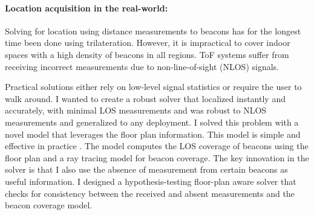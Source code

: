 \documentclass[10pt]{article}
\begin{document}
\paragraph{Location acquisition in the real-world: }
Solving for location using distance measurements to beacons has for the longest time been done using trilateration. However, it is impractical to cover indoor spaces with a high density of beacons in all regions. %
ToF systems suffer from receiving incorrect measurements due to 
non-line-of-sight (NLOS) signals. 

Practical solutions either rely on low-level signal statistics or require the user to walk around. %
I wanted to create a robust solver that localized instantly and accurately, with minimal LOS measurements and was robust to NLOS measurements and generalized to any deployment. I solved this problem with a novel model that leverages the floor plan information. This model is simple and effective in practice \cite{rajagopal2018enhancing}. The model computes the LOS coverage of beacons using the floor plan and a ray tracing model for beacon coverage. 
The key innovation in the solver is that I also use the absence of measurement from certain beacons as useful information. I designed a hypothesis-testing floor-plan aware solver that checks for consistency between the received and absent measurements and the beacon coverage model.
\end{document}

